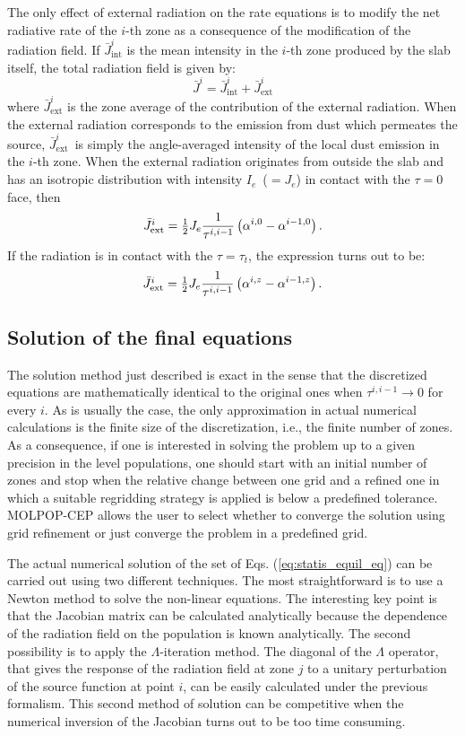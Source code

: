 \documentclass[12pt]{article}
\def\Ie       {\hbox{$I_e$}}
\def\Ji       {\hbox{$\bar J^i_\mathrm{ext}$}}
\def\half     {\hbox{$1\over2$}}
\def\t(#1){\tau^{#1}}
\def\a(#1){\alpha^{#1}}
\begin{document}
The only effect of external radiation on the rate equations is to modify the
net radiative rate of the $i$-th zone as a consequence of the modification of the radiation field.
If $\bar J_\mathrm{int}^i$ is the mean intensity in the $i$-th zone produced by the slab
itself, the total radiation field is given by:
\begin{equation}
\bar J^i = \bar J_\mathrm{int}^i + \bar J_\mathrm{ext}^i
\end{equation}
where $\bar J_\mathrm{ext}^i$ is the zone average of the contribution of the
external radiation. When the external radiation corresponds to the emission
from dust which permeates the source, \Ji\ is simply the angle-averaged
intensity of the local dust emission in the $i$-th zone. When the external
radiation originates from outside the slab and has an isotropic distribution
with intensity \Ie\ ($= J_e$) in contact with the $\tau = 0$ face, then
\begin{equation}
  \Ji = \half J_e{1\over\t(i,i-1)} \left( \a(i,0) - \a(i-1,0) \right).
\end{equation}
If the radiation is in contact with the $\tau=\tau_t$, the expression turns out
to be:
\begin{equation}
  \Ji = \half J_e{1\over\t(i,i-1)} \left( \a(i,z) - \a(i-1,z) \right).
\end{equation}

\subsection{Solution of the final equations}

The solution method just described is exact in the sense that the discretized
equations are mathematically identical to the original ones when $\t(i,i-1) \to
0$ for every $i$. As is usually the case, the only approximation in actual
numerical calculations is the finite size of the discretization, i.e., the
finite number of zones. As a consequence, if one is interested in solving the
problem up to a given precision in the level populations, one should start with
an initial number of zones and stop when the relative change between one grid
and a refined one in which a suitable regridding strategy is applied is below a
predefined tolerance. MOLPOP-CEP allows the user to select whether to converge
the solution using grid refinement or just converge the problem in a predefined
grid.

The actual numerical solution of the set of Eqs. (\ref{eq:statis_equil_eq}) can
be carried out using two different techniques. The most straightforward is to use
a Newton method to solve the non-linear equations. The interesting key point
is that the Jacobian matrix can be calculated analytically because the dependence
of the radiation field on the population is known analytically. The second
possibility is to apply the $\Lambda$-iteration method. The diagonal of the
$\Lambda$ operator, that gives the response of the radiation field at zone
$j$ to a unitary perturbation of the source function at point $i$, can be
easily calculated under the previous formalism. This second method of solution
can be competitive when the numerical inversion of the Jacobian turns out
to be too time consuming.
\end{document}

